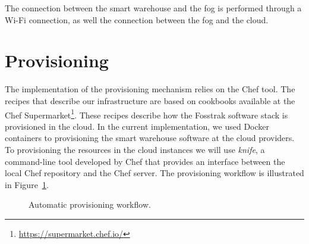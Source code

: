 The connection between the smart warehouse and the fog is performed through a Wi-Fi connection, as
well the connection between the fog and the cloud.

\section{Provisioning}
\label{sec:provisioning}
The implementation of the provisioning mechanism relies on the Chef tool. The recipes that describe our
infrastructure are based on cookbooks available at the Chef Supermarket\footnote{\url{https://supermarket.chef.io/}}.
These recipes describe how the Fosstrak software stack is provisioned in the cloud. In the current implementation,
we used Docker containers to provisioning the smart warehouse software at the cloud providers. To provisioning
the resources in the cloud instances we will use \textit{knife}, a command-line tool developed by
Chef that provides an interface between the local Chef repository and the Chef server. The provisioning
workflow is illustrated in Figure~\ref{fig:provisioning_tech_architecture}.\\

\begin{figure}
  \centering
  \caption{Automatic provisioning workflow.}
  \label{fig:provisioning_tech_architecture}
\end{figure}

